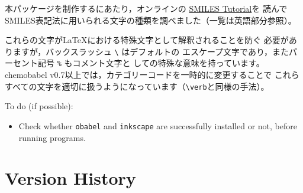 \documentclass[12pt]{ltjsarticle}
\begin{document}
本パッケージを制作するにあたり，オンラインの
\href{http://www.daylight.com/meetings/summerschool98/course/dave/smiles-intro.html}{SMILES Tutorial}を
読んでSMILES表記法に用いられる文字の種類を調べました（一覧は英語部分参照）。

これらの文字が\LaTeX における特殊文字として解釈されることを防ぐ
必要がありますが，バックスラッシュ \verb|\| はデフォルトの
エスケープ文字であり，またパーセント記号 \verb|%| もコメント文字と
しての特殊な意味を持っています。
\textsf{chemobabel} v0.7以上では，カテゴリーコードを一時的に変更することで
これらすべての文字を適切に扱うようになっています（\verb+\verb+と同様の手法）。

\clearpage

To do (if possible):
\begin{itemize}
\item Check whether \texttt{obabel} and \texttt{inkscape} are successfully
installed or not, before running programs.
\end{itemize}

\section{Version History}
\end{document}
